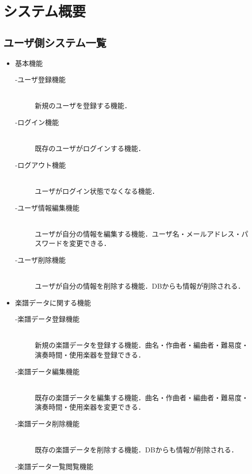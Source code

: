 \chapter{システム概要}
\vspace{-1cm}
\section{ユーザ側システム一覧}
\begin{itemize}
    \item 基本機能
          \begin{description}
              \item[-ユーザ登録機能]\mbox{}\\
              新規のユーザを登録する機能．
              \item[-ログイン機能] \mbox{}\\
                  既存のユーザがログインする機能．
              \item[-ログアウト機能] \mbox{}\\
                  ユーザがログイン状態でなくなる機能．
              \item[-ユーザ情報編集機能] \mbox{}\\
                  ユーザが自分の情報を編集する機能．ユーザ名・メールアドレス・パスワードを変更できる．
              \item[-ユーザ削除機能] \mbox{}\\
                  ユーザが自分の情報を削除する機能．DBからも情報が削除される．
          \end{description}
    \item 楽譜データに関する機能
          \begin{description}
              \item[-楽譜データ登録機能] \mbox{}\\
                  新規の楽譜データを登録する機能．曲名・作曲者・編曲者・難易度・演奏時間・使用楽器を登録できる．
              \item[-楽譜データ編集機能] \mbox{}\\
                  既存の楽譜データを編集する機能．曲名・作曲者・編曲者・難易度・演奏時間・使用楽器を変更できる．
              \item[-楽譜データ削除機能] \mbox{}\\
                  既存の楽譜データを削除する機能．DBからも情報が削除される．
              \item[-楽譜データ一覧閲覧機能] \mbox{}\\

\end{description}
\end{itemize}
